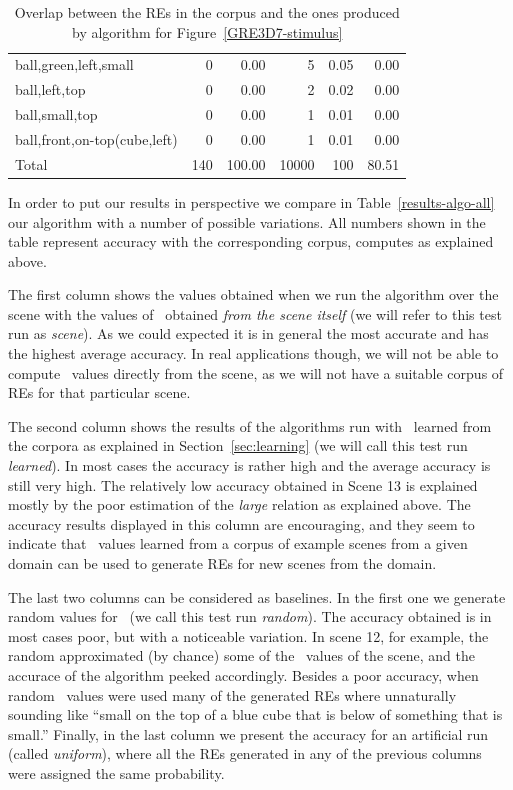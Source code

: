 \begin{table}[h!]
\begin{center}
\begin{tabular}{|l|r|r|r|r|r|}
ball,green,left,small                         &  0 &  0.00 &    5 &  0.05 &  0.00\\
ball,left,top                                 &  0 &  0.00 &    2 &  0.02 &  0.00\\
ball,small,top                                &  0 &  0.00 &    1 &  0.01 &  0.00\\
ball,front,on-top(cube,left)                  &  0 &  0.00 &    1 &  0.01 &  0.00\\
\hline
Total & 140 & 100.00 & 10000 & 100 & 80.51 \\
\hline
\end{tabular}
\caption{Overlap between the REs in the corpus and the ones produced by algorithm for Figure~\ref{GRE3D7-stimulus}\label{results-algo-fig3}}
\end{center}
\end{table}

In order to put our results in perspective we compare in Table~\ref{results-algo-all} 
our algorithm with a number of possible variations.  All numbers shown in the table 
represent accuracy with the corresponding corpus, computes as explained above. 
 
The first column shows the values obtained when we run the algorithm over the scene
with the values of \puse\ obtained \emph{from the scene itself} (we will refer to this
test run as \emph{scene}).  As we could expected
it is in general the most accurate and has the highest average accuracy. In real 
applications though, we will not be able to compute \puse\ values directly from the 
scene, as we will not have a suitable corpus of REs for that particular scene. 

The second column shows the results of the algorithms run with \puse\ learned from the 
corpora as explained in Section~\ref{sec:learning} (we will call this test run \emph{learned}).  In most cases the accuracy 
is rather high and the average accuracy is still very high. The relatively low accuracy 
obtained in Scene 13 is explained mostly by the poor estimation of the \emph{large} 
relation as explained above.  The accuracy results displayed in this column are 
encouraging, and they seem to indicate that \puse\ values learned from a corpus of example 
scenes from a given domain can be used to generate REs for new scenes from the domain. 

The last two columns can be considered as baselines. In the first one we generate 
random values for \puse\ (we call this test run \emph{random}).  The accuracy obtained is in most cases poor, but with 
a noticeable variation. In scene 12, for example, the random \puse approximated 
(by chance) some of the \puse\ values of the scene, and the accurace of the algorithm 
peeked accordingly.  Besides a poor accuracy, when random \puse\ values were used many of the generated REs where unnaturally sounding like ``small 
on the top of a blue cube that is below of something that is small.'' Finally, 
in the last column we present the accuracy for an artificial run (called \emph{uniform}), where all the 
REs generated in any of the previous columns were assigned the same 
probability. 

